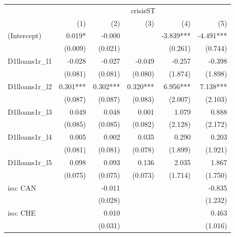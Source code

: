 \begin{tabular}{lrrrrr}
\toprule
                   &                           \multicolumn{5}{c}{crisisST}                           \\ 
\cmidrule(lr){2-6} 
                   &      (1) &      (2) &      (3) &                    (4) &                    (5) \\ 
\midrule
(Intercept)        &   0.019* &   -0.000 &          &              -3.839*** &              -4.491*** \\ 
                   &  (0.009) &  (0.021) &          &                (0.261) &                (0.744) \\ 
D1lloans1r\_l1     &   -0.028 &   -0.027 &   -0.049 &                 -0.257 &                 -0.398 \\ 
                   &  (0.081) &  (0.081) &  (0.080) &                (1.874) &                (1.898) \\ 
D1lloans1r\_l2     & 0.301*** & 0.302*** & 0.320*** &               6.956*** &               7.138*** \\ 
                   &  (0.087) &  (0.087) &  (0.083) &                (2.007) &                (2.103) \\ 
D1lloans1r\_l3     &    0.049 &    0.048 &    0.001 &                  1.079 &                  0.888 \\ 
                   &  (0.085) &  (0.085) &  (0.082) &                (2.128) &                (2.172) \\ 
D1lloans1r\_l4     &    0.005 &    0.002 &    0.035 &                  0.290 &                  0.203 \\ 
                   &  (0.081) &  (0.081) &  (0.078) &                (1.899) &                (1.921) \\ 
D1lloans1r\_l5     &    0.098 &    0.093 &    0.136 &                  2.035 &                  1.867 \\ 
                   &  (0.075) &  (0.075) &  (0.073) &                (1.714) &                (1.750) \\ 
iso: CAN           &          &   -0.011 &          &                        &                 -0.835 \\ 
                   &          &  (0.028) &          &                        &                (1.232) \\ 
iso: CHE           &          &    0.010 &          &                        &                  0.463 \\ 
                   &          &  (0.031) &          &                        &                (1.016) \\ 

\end{tabular}
